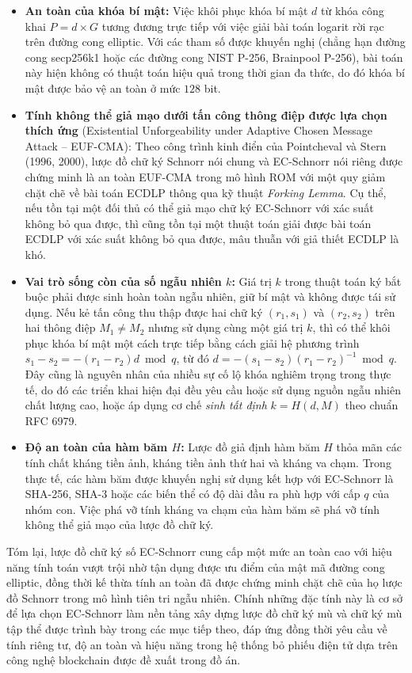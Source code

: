 \begin{itemize}
    \item \textbf{An toàn của khóa bí mật:} Việc khôi phục khóa bí mật $d$ từ khóa công khai $P = d \times G$ tương đương trực tiếp với việc giải bài toán logarit rời rạc trên đường cong elliptic. Với các tham số được khuyến nghị (chẳng hạn đường cong secp256k1 hoặc các đường cong NIST P-256, Brainpool P-256), bài toán này hiện không có thuật toán hiệu quả trong thời gian đa thức, do đó khóa bí mật được bảo vệ an toàn ở mức $128$ bit.

    \item \textbf{Tính không thể giả mạo dưới tấn công thông điệp được lựa chọn thích ứng} (Existential Unforgeability under Adaptive Chosen Message Attack -- EUF-CMA): Theo công trình kinh điển của Pointcheval và Stern (1996, 2000), lược đồ chữ ký Schnorr nói chung và EC-Schnorr nói riêng được chứng minh là an toàn EUF-CMA trong mô hình ROM với một quy giảm chặt chẽ về bài toán ECDLP thông qua kỹ thuật \textit{Forking Lemma}. Cụ thể, nếu tồn tại một đối thủ có thể giả mạo chữ ký EC-Schnorr với xác suất không bỏ qua được, thì cũng tồn tại một thuật toán giải được bài toán ECDLP với xác suất không bỏ qua được, mâu thuẫn với giả thiết ECDLP là khó.

    \item \textbf{Vai trò sống còn của số ngẫu nhiên $k$:} Giá trị $k$ trong thuật toán ký bắt buộc phải được sinh hoàn toàn ngẫu nhiên, giữ bí mật và không được tái sử dụng. Nếu kẻ tấn công thu thập được hai chữ ký $(r_1, s_1)$ và $(r_2, s_2)$ trên hai thông điệp $M_1 \neq M_2$ nhưng sử dụng cùng một giá trị $k$, thì có thể khôi phục khóa bí mật một cách trực tiếp bằng cách giải hệ phương trình $s_1 - s_2 = -(r_1 - r_2) d \bmod q$, từ đó $d = -(s_1 - s_2)(r_1 - r_2)^{-1} \bmod q$. Đây cũng là nguyên nhân của nhiều sự cố lộ khóa nghiêm trọng trong thực tế, do đó các triển khai hiện đại đều yêu cầu hoặc sử dụng nguồn ngẫu nhiên chất lượng cao, hoặc áp dụng cơ chế \textit{sinh tất định} $k = H(d, M)$ theo chuẩn RFC 6979.

    \item \textbf{Độ an toàn của hàm băm $H$:} Lược đồ giả định hàm băm $H$ thỏa mãn các tính chất kháng tiền ảnh, kháng tiền ảnh thứ hai và kháng va chạm. Trong thực tế, các hàm băm được khuyến nghị sử dụng kết hợp với EC-Schnorr là SHA-256, SHA-3 hoặc các biến thể có độ dài đầu ra phù hợp với cấp $q$ của nhóm con. Việc phá vỡ tính kháng va chạm của hàm băm sẽ phá vỡ tính không thể giả mạo của lược đồ chữ ký.
\end{itemize}

Tóm lại, lược đồ chữ ký số EC-Schnorr cung cấp một mức an toàn cao với hiệu năng tính toán vượt trội nhờ tận dụng được ưu điểm của mật mã đường cong elliptic, đồng thời kế thừa tính an toàn đã được chứng minh chặt chẽ của họ lược đồ Schnorr trong mô hình tiên tri ngẫu nhiên. Chính những đặc tính này là cơ sở để lựa chọn EC-Schnorr làm nền tảng xây dựng lược đồ chữ ký mù và chữ ký mù tập thể được trình bày trong các mục tiếp theo, đáp ứng đồng thời yêu cầu về tính riêng tư, độ an toàn và hiệu năng trong hệ thống bỏ phiếu điện tử dựa trên công nghệ blockchain được đề xuất trong đồ án.
